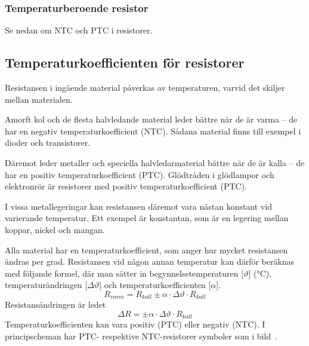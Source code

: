 \subsubsection{Temperaturberoende resistor}

Se nedan om NTC och PTC i resistorer.

\subsection{Temperaturkoefficienten för resistorer}
\label{resistor_temperaturkoefficient}

Resistansen i ingående material påverkas av temperaturen, varvid det skiljer
mellan materialen.

Amorft kol och de flesta halvledande material leder bättre när de är varma -- de
har en negativ temperaturkoefficient (NTC). Sådana material finns till exempel i
dioder och transistorer.

Däremot leder metaller och speciella halvledarmaterial bättre när de är kalla
-- de har en positiv temperaturkoefficient (PTC). Glödtråden i glödlampor och
elektronrör är resistorer med positiv temperaturkoefficient (PTC).

I vissa metallegeringar kan resistansen däremot vara nästan konstant vid
varierande temperatur.
Ett exempel är konstantan, som är en legering mellan koppar, nickel och mangan.

Alla material har en temperaturkoefficient, som anger hur mycket resistansen
ändras per grad. Resistansen vid någon annan temperatur kan därför beräknas med
följande formel, där man sätter in begynnelsetemperaturen [\(\vartheta\)]
(\unit{\degreeCelsius}), temperaturändringen [\(\Delta \vartheta\)] och
temperaturkoefficienten [\(\alpha\)].
\[R_{varm} = R_{kall} \pm \alpha \cdot \Delta \vartheta \cdot R_{kall}\]
Resistansändringen är ledet
\[ \Delta R = \pm \alpha \cdot \Delta \vartheta \cdot R_{kall}\]
Temperaturkoefficienten kan vara positiv (PTC) eller negativ (NTC).
I principscheman har PTC- respektive NTC-resistorer symboler som i bild~.


